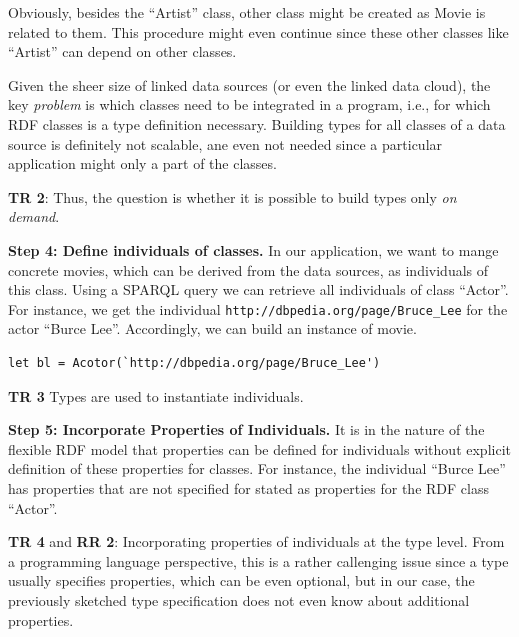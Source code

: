 \documentclass{llncs} %
\newcommand{\rr}[1]{\textbf{RR #1}}
\newcommand{\tr}[1]{\textbf{TR #1}}
\begin{document}
Obviously, besides the ``Artist'' class, other class might be created as Movie is related to them. This procedure might even continue since
these other classes like ``Artist'' can depend on other classes.

Given the sheer size of linked data sources (or even the linked data cloud), the key \emph{problem} is which classes need to be 
integrated in a program, i.e., for which RDF classes is a type definition necessary. Building types for all classes of a
data source is definitely not scalable, ane even not needed since a particular application 
might only a part of the classes.

\tr{2}: Thus, the question is whether it is possible to build types only \emph{on demand}.

\vspace{0.8em}
\noindent
\textbf{Step 4: Define individuals of classes.}
In our application, we want to mange concrete movies, which can be derived from the data sources,
as individuals of this class. Using a SPARQL query we can retrieve all individuals of class ``Actor''.
For instance, we get the individual \texttt{http://dbpedia.org/page/Bruce\_Lee} for the actor ``Burce Lee''.
Accordingly, we can build an instance of movie.

\begin{lstlisting}[style=code, caption={Individual of  ``Actor'' }, label={lst:skyfall}]
let bl = Acotor(`http://dbpedia.org/page/Bruce_Lee')
\end{lstlisting}

\tr{3} Types are used to instantiate individuals. 

\vspace{0.8em}
\noindent
\textbf{Step 5: Incorporate Properties of Individuals.}
It is in the nature of the flexible RDF model that properties can be defined for individuals 
without explicit definition of these properties for classes. For instance, the individual
``Burce Lee'' has properties that are not specified for stated as properties for the RDF class ``Actor''.

\tr{4} and \rr{2}: Incorporating properties of individuals at the type level. From a programming language perspective,
this is a rather callenging issue since a type usually specifies properties, which can be even optional,
but in our case, the previously sketched type specification does not even know about additional properties.
\end{document}
